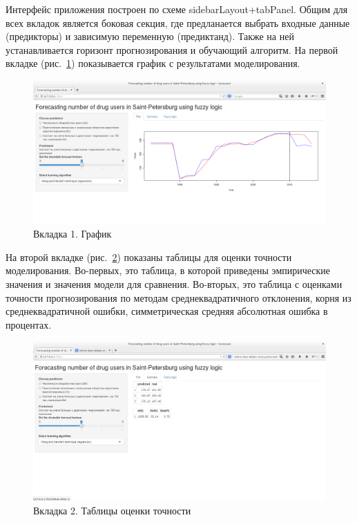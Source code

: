 Интерфейс приложения построен по схеме sidebarLayout+tabPanel. Общим для всех
вкладок является боковая секция, где предланается выбрать входные данные
(предикторы) и зависимую переменную (предиктанд). Также на ней устанавливается
горизонт прогнозирования и обучающий алгоритм. На первой вкладке
(рис.~\ref{figure:screenshot1}) показывается график с результатами
моделирования.  

\begin{figure}[bhtp]
    \includegraphics{images/screenshot1.png}
    \caption{Вкладка 1. График}		
    \label{figure:screenshot1}
\end{figure}

На второй вкладке (рис.~\ref{figure:screenshot2}) показаны таблицы для оценки
точности моделирования. Во-первых, это таблица, в которой приведены эмпирические
значения и значения модели для сравнения. Во-вторых, это таблица с оценками
точности прогнозирования по методам среднеквадратичного отклонения, корня из
среднеквадратичной ошибки, симметрическая средняя абсолютная ошибка в процентах.

\begin{figure}[bhtp]
    \includegraphics{images/screenshot2.png}
    \caption{Вкладка 2. Таблицы оценки точности}		
    \label{figure:screenshot2}
\end{figure}

